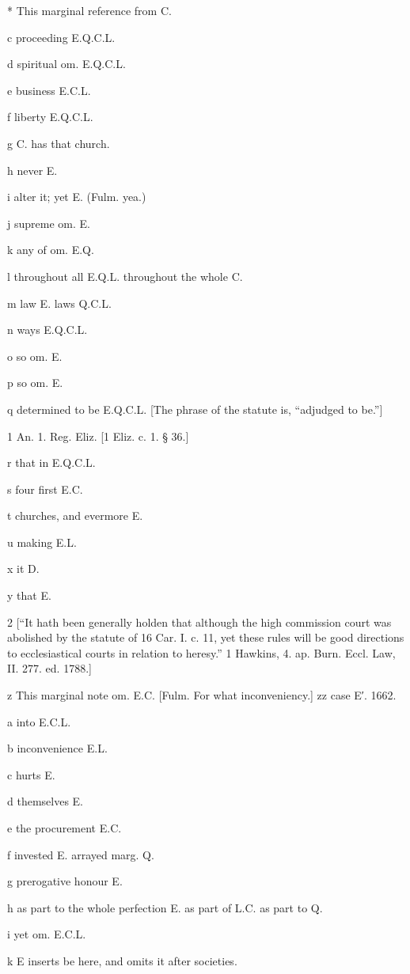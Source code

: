 *
This marginal reference from C.

c
proceeding E.Q.C.L.

d
spiritual om. E.Q.C.L.

e
business E.C.L.

f
liberty E.Q.C.L.

g
C. has that church.

h
never E.

i
alter it; yet E. (Fulm. yea.)

j
supreme om. E.

k
any of om. E.Q.

l
throughout all E.Q.L. throughout the whole C.

m
law E. laws Q.C.L.

n
ways E.Q.C.L.

o
so om. E.

p
so om. E.

q
determined to be E.Q.C.L. [The phrase of the statute is, “adjudged to be.”]

1
An. 1. Reg. Eliz. [1 Eliz. c. 1. § 36.]

r
that in E.Q.C.L.

s
four first E.C.

t
churches, and evermore E.

u
making E.L.

x
it D.

y
that E.

2
[“It hath been generally holden that although the high commission court was abolished by the statute of 16 Car. I. c. 11, yet these rules will be good directions to ecclesiastical courts in relation to heresy.” 1 Hawkins, 4. ap. Burn. Eccl. Law, II. 277. ed. 1788.]

z This marginal note om. E.C. [Fulm. For what inconveniency.]
zz
case E′. 1662.

a
into E.C.L.

b
inconvenience E.L.

c
hurts E.

d
themselves E.

e
the procurement E.C.

f
invested E. arrayed marg. Q.

g
prerogative honour E.

h
as part to the whole perfection E. as part of L.C. as part to Q.

i
yet om. E.C.L.

k
E inserts be here, and omits it after societies.

